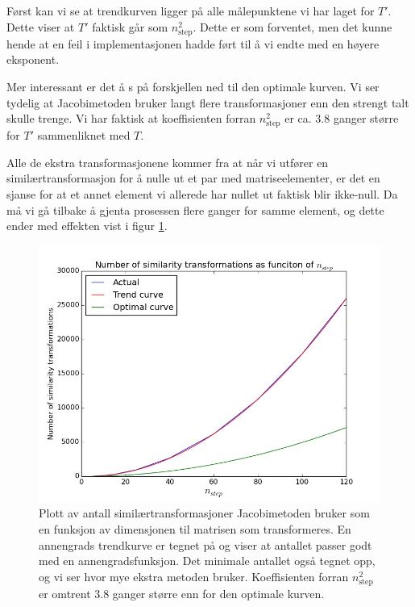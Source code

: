 \documentclass[11pt]{article}
\begin{document}
Først kan vi se at trendkurven ligger på alle målepunktene vi har
laget for $T'$. Dette viser at $T'$ faktisk går som
$n_\text{step}^2$. Dette er som forventet, men det kunne hende at en
feil i implementasjonen hadde ført til å vi endte med en høyere
eksponent.

Mer interessant er det å s på forskjellen ned til den optimale
kurven. Vi ser tydelig at Jacobimetoden bruker langt flere
transformasjoner enn den strengt talt skulle trenge. Vi har faktisk at
koeffisienten forran $n_\text{step}^2$ er ca. $3.8$ ganger større for
$T'$ sammenliknet med $T$. 

Alle de ekstra transformasjonene kommer fra at når vi utfører en
similærtransformasjon for å nulle ut et par med matriseelementer, er
det en sjanse for at et annet element vi allerede har nullet ut
faktisk blir ikke-null. Da må vi gå tilbake å gjenta prosessen flere
ganger for samme element, og dette ender med effekten vist i figur \ref{fig:number-of-transformations}.

\begin{figure}[ht]
  \centering
  \includegraphics[scale=0.5]{fig/number_of_transformations_trend_plot.jpg}
  \caption{\label{fig:number-of-transformations} Plott av antall
    similærtransformasjoner Jacobimetoden bruker som en funksjon av
    dimensjonen til matrisen som transformeres. En annengrads
    trendkurve er tegnet på og viser at antallet passer godt med en
    annengradsfunksjon. Det minimale antallet også tegnet opp, og vi
    ser hvor mye ekstra metoden bruker. Koeffisienten forran
    $n_\text{step}^2$ er omtrent $3.8$ ganger større enn for den
    optimale kurven.}
\end{figure}
\end{document}

